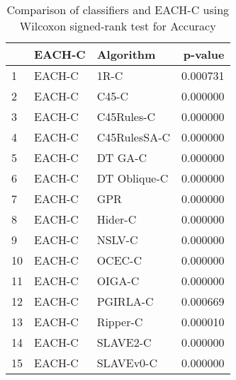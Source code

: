 \begin{table}
\footnotesize
\caption{Comparison of classifiers and EACH-C using Wilcoxon signed-rank test for Accuracy}
\label{tab:EACH-C wilcoxon Accuracy comparison}
\begin{tabular}{lllr}
\hline
 & EACH-C & Algorithm & p-value \\
\hline
1 & EACH-C & 1R-C & 0.000731 \\
2 & EACH-C & C45-C & 0.000000 \\
3 & EACH-C & C45Rules-C & 0.000000 \\
4 & EACH-C & C45RulesSA-C & 0.000000 \\
5 & EACH-C & DT GA-C & 0.000000 \\
6 & EACH-C & DT Oblique-C & 0.000000 \\
7 & EACH-C & GPR & 0.000000 \\
8 & EACH-C & Hider-C & 0.000000 \\
9 & EACH-C & NSLV-C & 0.000000 \\
10 & EACH-C & OCEC-C & 0.000000 \\
11 & EACH-C & OIGA-C & 0.000000 \\
12 & EACH-C & PGIRLA-C & 0.000669 \\
13 & EACH-C & Ripper-C & 0.000010 \\
14 & EACH-C & SLAVE2-C & 0.000000 \\
15 & EACH-C & SLAVEv0-C & 0.000000 \\
\hline
\end{tabular}
\end{table}
